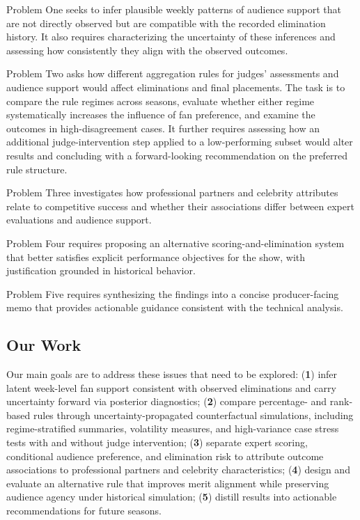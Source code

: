 Problem One seeks to infer plausible weekly patterns of audience support that are not directly observed but are compatible with the recorded elimination history. It also requires characterizing the uncertainty of these inferences and assessing how consistently they align with the observed outcomes.

Problem Two asks how different aggregation rules for judges’ assessments and audience support would affect eliminations and final placements. The task is to compare the rule regimes across seasons, evaluate whether either regime systematically increases the influence of fan preference, and examine the outcomes in high-disagreement cases. It further requires assessing how an additional judge-intervention step applied to a low-performing subset would alter results and concluding with a forward-looking recommendation on the preferred rule structure.

Problem Three investigates how professional partners and celebrity attributes relate to competitive success and whether their associations differ between expert evaluations and audience support.

Problem Four requires proposing an alternative scoring-and-elimination system that better satisfies explicit performance objectives for the show, with justification grounded in historical behavior.

Problem Five requires synthesizing the findings into a concise producer-facing memo that provides actionable guidance consistent with the technical analysis.


\subsection{Our Work}



Our main goals are to address these issues that need to be explored: (\textbf{1}) infer latent week-level fan support consistent with observed eliminations and carry uncertainty forward via posterior diagnostics; (\textbf{2}) compare percentage- and rank-based rules through uncertainty-propagated counterfactual simulations, including regime-stratified summaries, volatility measures, and high-variance case stress tests with and without judge intervention; (\textbf{3}) separate expert scoring, conditional audience preference, and elimination risk to attribute outcome associations to professional partners and celebrity characteristics; (\textbf{4}) design and evaluate an alternative rule that improves merit alignment while preserving audience agency under historical simulation; (\textbf{5}) distill results into actionable recommendations for future seasons.


